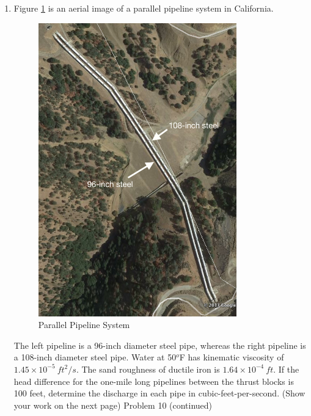 \documentclass[11pt]{article}
\begin{document}
\begin{enumerate}
\clearpage
\item Figure \ref{fig:parallelpipes} is an aerial image of a parallel pipeline system in California.   

\begin{figure}[htbp] %
   \centering
   \includegraphics[height=5in]{parallelpipes.jpg} 
   \caption{Parallel Pipeline System}
   \label{fig:parallelpipes}
\end{figure}

The left pipeline is a 96-inch diameter steel pipe, whereas the right pipeline is a 108-inch diameter steel pipe.  
Water at 50$^o$F has kinematic viscosity of $1.45\times10^{-5}~ft^2/s$.   
The sand roughness of ductile iron is $1.64\times10^{-4}~ft$.   
If the head difference for the one-mile long pipelines between the thrust blocks is 100 feet, determine the discharge in each pipe in cubic-feet-per-second.
(Show your work on the next page)
\clearpage
Problem 10 (continued)
\clearpage


\end{enumerate}
\end{document}
